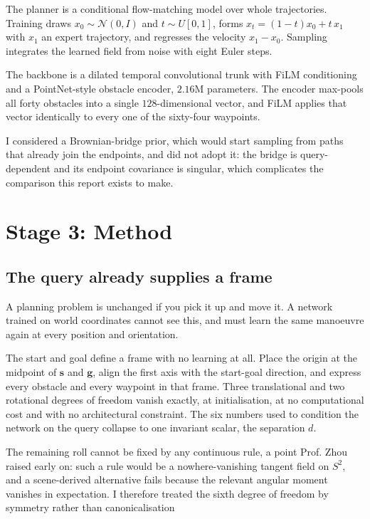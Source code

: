 \documentclass[11pt,a4paper]{article}
\newcommand{\svec}{\mathbf{s}}
\newcommand{\gvec}{\mathbf{g}}
\begin{document}
The planner is a conditional flow-matching model over whole trajectories.
Training draws $x_0 \sim \mathcal{N}(0,I)$ and $t \sim U[0,1]$, forms
$x_t = (1-t)x_0 + t\,x_1$ with $x_1$ an expert trajectory, and regresses the
velocity $x_1 - x_0$. Sampling integrates the learned field from noise with eight
Euler steps.

The backbone is a dilated temporal convolutional trunk with FiLM conditioning and
a PointNet-style obstacle encoder, $2.16$M parameters. The encoder max-pools all
forty obstacles into a single $128$-dimensional vector, and FiLM applies that
vector identically to every one of the sixty-four waypoints.

I considered a Brownian-bridge prior, which would start sampling from paths that
already join the endpoints, and did not adopt it: the bridge
is query-dependent and its endpoint covariance is singular, which complicates the
comparison this report exists to make.

\section{Stage 3: Method}
\label{sec:method}

\subsection{The query already supplies a frame}


A planning problem is unchanged if you pick it up and move it. A network trained on world coordinates cannot see this, and must learn the same
manoeuvre again at every position and orientation.

The start and goal define a frame with no learning at all. Place the origin at
the midpoint of $\svec$ and $\gvec$, align the first axis with the start-goal
direction, and express every obstacle and every waypoint in that frame. Three
translational and two rotational degrees of freedom vanish exactly, at
initialisation, at no computational cost and with no architectural constraint.
The six numbers used to condition the network on the query collapse to one
invariant scalar, the separation $d$.

The remaining roll cannot be fixed by any continuous rule, a point Prof. Zhou raised early on: such a rule would be a nowhere-vanishing tangent field on $S^2$, and a scene-derived alternative fails because the relevant angular moment vanishes in expectation. I therefore treated the sixth degree of freedom by symmetry rather than canonicalisation
\end{document}
